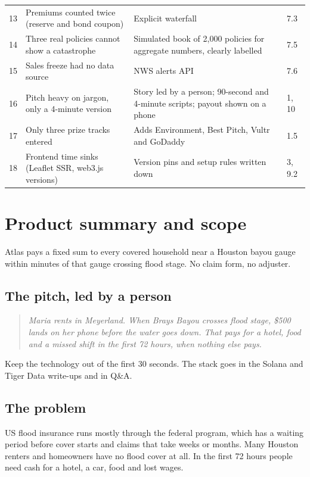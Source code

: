 \documentclass[11pt]{article}
\begin{document}
{\begin{xltabular}{\linewidth}{@{}r L{4.6cm} Y L{1.3cm}@{}}
13 & Premiums counted twice (reserve and bond coupon) & Explicit waterfall & 7.3 \\
14 & Three real policies cannot show a catastrophe & Simulated book of 2,000 policies for aggregate numbers, clearly labelled & 7.5 \\
15 & Sales freeze had no data source & NWS alerts API & 7.6 \\
16 & Pitch heavy on jargon, only a 4-minute version & Story led by a person; 90-second and 4-minute scripts; payout shown on a phone & 1, 10 \\
17 & Only three prize tracks entered & Adds Environment, Best Pitch, Vultr and GoDaddy & 1.5 \\
18 & Frontend time sinks (Leaflet SSR, web3.js versions) & Version pins and setup rules written down & 3, 9.2 \\
\bottomrule
\end{xltabular}
}

\section{Product summary and scope}

Atlas pays a fixed sum to every covered household near a Houston bayou gauge within minutes of that gauge crossing flood stage. No claim form, no adjuster.

\subsection{The pitch, led by a person}
\begin{quote}\itshape
Maria rents in Meyerland. When Brays Bayou crosses flood stage, \$500 lands on her phone before the water goes down. That pays for a hotel, food and a missed shift in the first 72 hours, when nothing else pays.
\end{quote}
Keep the technology out of the first 30 seconds. The stack goes in the Solana and Tiger Data write-ups and in Q\&A.

\subsection{The problem}
US flood insurance runs mostly through the federal program, which has a waiting period before cover starts and claims that take weeks or months. Many Houston renters and homeowners have no flood cover at all. In the first 72 hours people need cash for a hotel, a car, food and lost wages.
\end{document}
